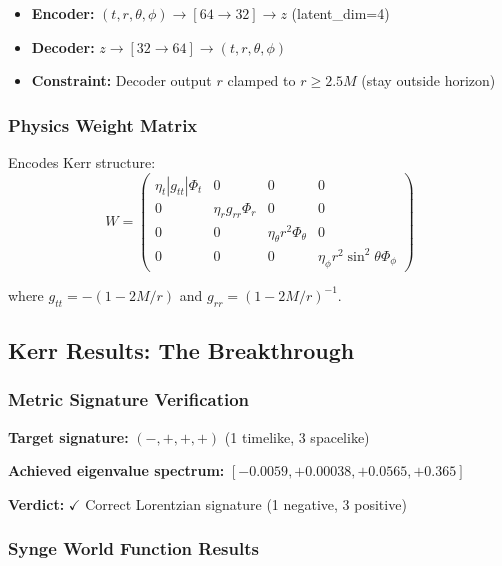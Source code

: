 \documentclass[11pt,a4paper]{article}
\begin{document}
\begin{itemize}
\item \textbf{Encoder:} $(t,r,\theta,\phi) \to [64 \to 32] \to z$ (latent\_dim=4)
\item \textbf{Decoder:} $z \to [32 \to 64] \to (t,r,\theta,\phi)$
\item \textbf{Constraint:} Decoder output $r$ clamped to $r \geq 2.5M$ (stay outside horizon)
\end{itemize}

\subsubsection{Physics Weight Matrix}

Encodes Kerr structure:
\begin{equation}
W = \begin{pmatrix}
\eta_t|g_{tt}|\Phi_t & 0 & 0 & 0 \\
0 & \eta_r g_{rr}\Phi_r & 0 & 0 \\
0 & 0 & \eta_\theta r^2\Phi_\theta & 0 \\
0 & 0 & 0 & \eta_\phi r^2\sin^2\theta\Phi_\phi
\end{pmatrix}
\end{equation}

where $g_{tt} = -(1-2M/r)$ and $g_{rr} = (1-2M/r)^{-1}$.

\subsection{Kerr Results: The Breakthrough}

\subsubsection{Metric Signature Verification}

\textbf{Target signature:} $(-,+,+,+)$ (1 timelike, 3 spacelike)

\textbf{Achieved eigenvalue spectrum:} $[-0.0059, +0.00038, +0.0565, +0.365]$

\textbf{Verdict:} $\checkmark$ Correct Lorentzian signature (1 negative, 3 positive)

\subsubsection{Synge World Function Results}
\end{document}
